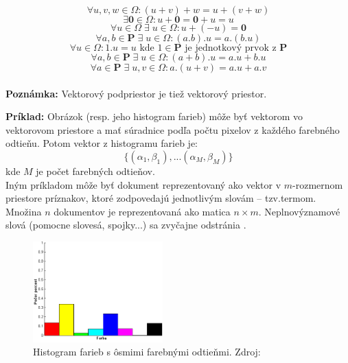 \documentclass[12pt,a4paper,oneside]{fithesis2}
\begin{document}
\begin{equation*}
\forall u,v,w \in \Omega : (u + v)+w = u+(v+w) 
\end{equation*}
\begin{equation*}
\exists\mathbf{0} \in \Omega : u+\mathbf{0} = \mathbf{0}+u = u
\end{equation*}
\begin{equation*}
\forall u \in \Omega \; \exists \; u \in \Omega : u+(-u)  = \mathbf{0}
\end{equation*}
\begin{equation*}
\forall a,b \in \mathbf{P} \; \exists \; u \in \Omega : (a.b).u = a.(b.u) 
\end{equation*}
\begin{equation*}
\forall u \in \Omega : 1.u=u  \textrm{ kde } 1 \in \mathbf{P}  \textrm{ je jednotkový prvok z } \mathbf{P} 
\end{equation*}
\begin{equation*}
\forall a,b \in \mathbf{P} \; \exists \;u \in \Omega : (a+b).u = a.u + b.u 
\end{equation*}
\begin{equation*}
\forall a \in \mathbf{P} \; \exists \;u,v \in \Omega : a.(u+v) = a.u + a.v 
\end{equation*} \\
\textbf{Poznámka:} Vektorový podpriestor je tiež vektorový priestor.

\textbf{Príklad:}
Obrázok (resp. jeho histogram farieb) môže byť vektorom vo vektorovom priestore a mať súradnice podľa počtu pixelov z každého farebného odtieňu.
Potom vektor z histogramu farieb je:
\begin{equation*}
\{(\alpha_1,\beta_1),...(\alpha_M,\beta_M)\}
\end{equation*}
kde $M$ je počet farebných odtieňov. \\
Iným príkladom môže byť dokument reprezentovaný ako
vektor v $m$-rozmernom priestore príznakov, ktoré zodpovedajú jednotlivým slovám – tzv.termom. Množina $n$ dokumentov je reprezentovaná ako matica $n\times m$. Neplnovýznamové slová (pomocne slovesá, spojky...) sa zvyčajne odstránia \cite{vectorspace}. 

\begin{figure}[h']
  \centering
  \includegraphics[width=5cm]{obr/histogram.png}
  \caption{Histogram farieb s ôsmimi farebnými odtieňmi. Zdroj:\cite{histogram}}
  \label{fig:triangle}
\end{figure}  
\end{document}
